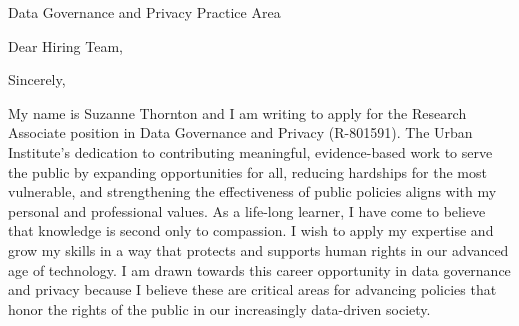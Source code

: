 \documentclass[11pt,a4paper,sans]{moderncv}
\begin{document}
	
	{Data Governance and Privacy Practice Area}
	\date{\today }
	\opening{Dear Hiring Team,}
	\closing{Sincerely,}
	\makelettertitle
	

	
	My name is Suzanne Thornton and I am writing to apply for the Research Associate position in Data Governance and Privacy (R-801591). The Urban Institute's dedication to contributing meaningful, evidence-based work to serve the public by expanding opportunities for all, reducing hardships for the most vulnerable, and strengthening the effectiveness of public policies aligns with my personal and professional values. As a life-long learner, I have come to believe that knowledge is second only to compassion. I wish to apply my expertise and grow my skills in a way that protects and supports human rights in our advanced age of technology. I am drawn towards this career opportunity in data governance and privacy because I believe these are critical areas for advancing policies that honor the rights of the public in our increasingly data-driven society.
\end{document}
